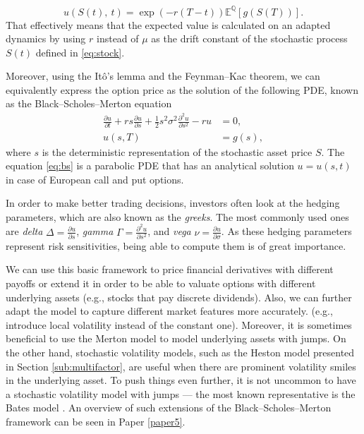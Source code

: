 \documentclass{UUThesisTemplate}
\begin{document}
\begin{equation}
\label{eq:mc}
u(S(t),\ t)=\exp\left(-r(T-t)\right)\mathbb{E}^{\mathbb{Q}}\left[g(S(T))\right].
\end{equation}
That effectively means that the expected value is calculated on an adapted dynamics by using $r$ instead of $\mu$ as the drift constant of the stochastic process $S(t)$ defined in \eqref{eq:stock}. 
\par Moreover, using the It\^o's lemma and the Feynman--Kac theorem, we can equivalently express the option price as the solution of the following PDE, known as the Black--Scholes--Merton equation
\begin{align}
\frac{\partial u}{\partial t} + r s \frac{\partial u} {\partial s} + \frac{1}{2} s^2 \sigma^2 \frac{\partial^2 u}{\partial s^2} - r u &= 0, \nonumber \\
u(s,T) &= g(s), \label{eq:bs}
\end{align}
where $s$ is the deterministic representation of the stochastic asset price $S$. The equation \eqref{eq:bs} is a parabolic PDE that has an analytical solution $u=u(s,t)$ in case of European call and put options. %
\par In order to make better trading decisions, investors often look at the hedging parameters, which are also known as the \emph{greeks}. The most commonly used ones are \emph{delta} $\Delta = \frac{\partial u}{\partial s}$, \emph{gamma} $\Gamma = \frac{\partial^2 u}{\partial s^2}$, and \emph{vega} $\nu = \frac{\partial u}{\partial \sigma}$. As these hedging parameters represent risk sensitivities, being able to compute them is of great importance.
\par We can use this basic framework to price financial derivatives with different payoffs or extend it in order to be able to valuate options with different underlying assets (e.g., stocks that pay discrete dividends). Also, we can further adapt the model to capture different market features more accurately. (e.g., introduce local volatility instead of the constant one). Moreover, it is sometimes beneficial to use the Merton model \cite{merton1976option} to model underlying assets with jumps. On the other hand, stochastic volatility models, such as the Heston model presented in Section \ref{sub:multifactor}, are useful when there are prominent volatility smiles in the underlying asset. To push things even further, it is not uncommon to have a stochastic volatility model with jumps --- the most known representative is the Bates model \cite{bates1996jumps}. An overview of such extensions of the Black--Scholes--Merton framework can be seen in Paper \ref{paper5}.
%
\end{document}
